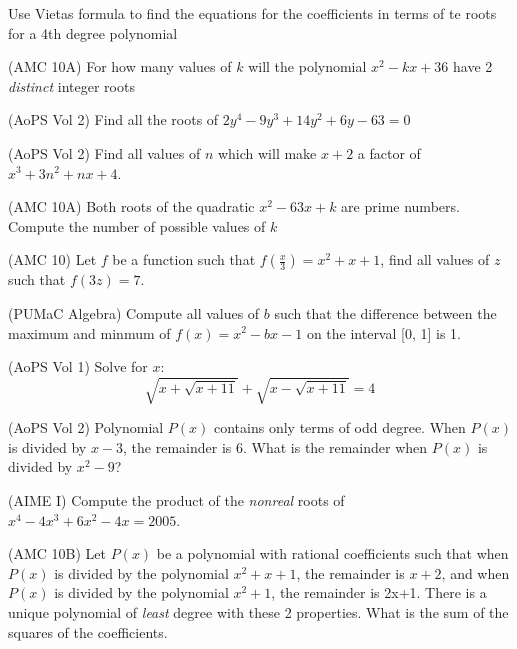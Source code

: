 \documentclass[11pt]{article}
\begin{document}
\begin{exercise}
    Use Vietas formula to find the equations for the coefficients in terms of te roots for a 4th degree polynomial
\end{exercise}
\begin{exercise}
    (AMC 10A) For how many values of $k$ will the polynomial $x^2-kx+36$ have 2 \textit{distinct} integer roots
\end{exercise}
\begin{exercise}
    (AoPS Vol 2) Find all the roots of $2y^4-9y^3+14y^2+6y-63=0$
\end{exercise}
\begin{exercise}
    (AoPS Vol 2) Find all values of $n$ which will make $x+2$ a factor of $x^3+3n^2+nx+4$.
\end{exercise}
\begin{exercise}
    (AMC 10A) Both roots of the quadratic $x^2-63x+k$ are prime numbers. Compute the number of possible values of $k$
\end{exercise}
\begin{exercise}
    (AMC 10) Let $f$ be a function such that $f(\frac{x}{3}) = x^2+x+1$, find all values of $z$ such that $f(3z)= 7$.
\end{exercise}
\begin{exercise}
    (PUMaC Algebra) Compute all values of $b$ such that the difference between the maximum and minmum of $f(x)=x^2-bx-1$ on the interval [0, 1] is 1.
\end{exercise}
\begin{exercise}
    (AoPS Vol 1) Solve for $x$: 
    \[
     \sqrt{x+\sqrt{x+11}}+\sqrt{x-\sqrt{x+11}} = 4
    \]
\end{exercise}
\begin{exercise}
    (AoPS Vol 2) Polynomial $P(x)$ contains only terms of odd degree. When $P(x)$ is divided by $x-3$, the remainder is 6. What is the remainder when $P(x)$ is divided by $x^2-9$?
\end{exercise}
\begin{exercise}
    (AIME I) Compute the product of the \textit{nonreal}   roots of $x^4-4x^3+6x^2-4x=2005$.
\end{exercise}
\begin{exercise}
    (AMC 10B) Let $P(x)$ be a polynomial with rational coefficients such that when $P(x)$ is divided by the polynomial $x^2+x+1$, the remainder is $x+2$, and when $P(x)$ is divided by the polynomial $x^2+1$, the remainder is 2x+1. There is a unique polynomial of \textit{least} degree with these 2 properties. What is the sum of the squares of the coefficients.
\end{exercise}
\end{document}
